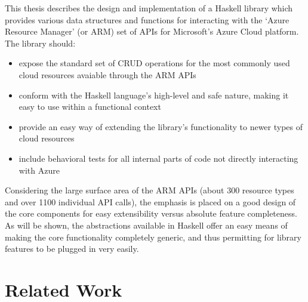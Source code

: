 \documentclass[11pt]{report}
\begin{document}
This thesis describes the design and implementation of a Haskell library which
provides various data structures and functions for interacting with the
`Azure Resource Manager' (or ARM) set of APIs for Microsoft's Azure Cloud
platform.
\newline
The library should:
\begin{itemize}
    \item{} expose the standard set of CRUD operations for the most commonly
        used cloud resources avaiable through the ARM APIs
    \item{} conform with the Haskell language's high-level and safe nature,
        making it easy to use within a functional context
    \item{} provide an easy way of extending the library's functionality to
        newer types of cloud resources
    \item{} include behavioral tests for all internal parts of code not
        directly interacting with Azure
\end{itemize}
Considering the large surface area of the ARM APIs (about 300 resource
types and over 1100 individual API calls), the emphasis is placed on a
good design of the core components for easy extensibility versus absolute
feature completeness. As will be shown, the abstractions available in Haskell
offer an easy means of making the core functionality completely generic,
and thus permitting for library features to be plugged in very easily.


\section{Related Work}
\end{document}
